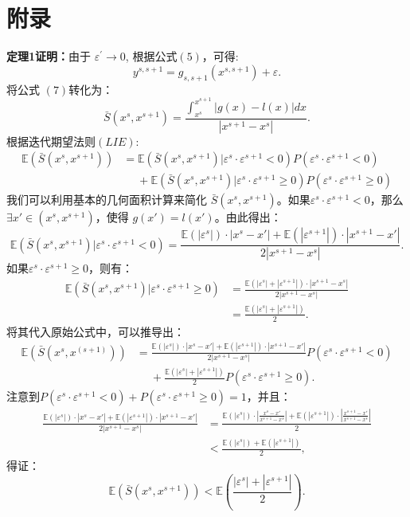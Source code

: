\documentclass[12pt,a4paper]{article}%
\begin{document}
	\section*{附录}
	\noindent\textbf{定理1证明：}由于 $\varepsilon^\prime\rightarrow0$, 根据公式$(5)$，可得: 
	$$y^{s,s+1}=g_{s,s+1}(x^{s,s+1})+\varepsilon.$$
	将公式 $(7)$转化为：
	$$\bar{S}(x^s,x^{s+1})=\frac{\int_{x^s}^{x^{s+1}}|g(x)-l(x)|  dx}{|x^{s+1}-x^s|}.$$
	根据迭代期望法则$(LIE)$:
	$$\begin{aligned}
		\mathbb{E}(\bar{S}(x^s,x^{s+1}))&=\mathbb{E}(\bar{S}(x^s,x^{s+1})|\varepsilon^s\cdot\varepsilon^{s+1}<0)P(\varepsilon^s\cdot\varepsilon^{s+1}<0) \\
		&\quad\; +\mathbb{E}(\bar{S}(x^s,x^{s+1})|\varepsilon^s\cdot\varepsilon^{s+1}\ge0)P(\varepsilon^s\cdot\varepsilon^{s+1}\ge0)
		\end{aligned}$$
	我们可以利用基本的几何面积计算来简化 $\bar{S}(x^s,x^{s+1})$。如果$\varepsilon^s\cdot\varepsilon^{s+1}<0$，那么$\exists{x'}\in(x^s,x^{s+1})$，使得 $g(x')=l(x')$。由此得出：
	$$\mathbb{E}(\bar{S}(x^s,x^{s+1})|\varepsilon^s\cdot\varepsilon^{s+1}<0)=\frac{\mathbb{E}(|\varepsilon^s|)\cdot|x^s-x'|+\mathbb{E}(|\varepsilon^{s+1}|)\cdot|x^{s+1}-x'|}{2|x^{s+1}-x^s|}.$$
	如果$\varepsilon^s\cdot\varepsilon^{s+1}\ge0$，则有：
	$$\begin{aligned}
    \mathbb{E}(\bar{S}(x^s,x^{s+1})|\varepsilon^s\cdot\varepsilon^{s+1}\ge0)&=\frac{\mathbb{E}(|\varepsilon^s|+|\varepsilon^{s+1}|)\cdot|x^{s+1}-x^{s}|}{2|x^{s+1}-x^s|}\\&=\frac{\mathbb{E}(|\varepsilon^s|+|\varepsilon^{s+1}|)}{2}.
    \end{aligned}$$
	将其代入原始公式中，可以推导出：
	$$\begin{aligned}
		\mathbb{E}({\bar{S}(x^{s}, x^{(s+1)})})&=
		\frac{{\mathbb{E}(|\varepsilon^s|)\cdot|x^s-x'|+\mathbb{E}(|\varepsilon^{s+1}|)\cdot|x^{s+1}-x'|}}{2|x^{s+1}-x^s|}P(\varepsilon^s\cdot\varepsilon^{s+1}<0)\\
		&\;\quad+\frac{\mathbb{E}(|\varepsilon^s|+|\varepsilon^{s+1}|)}{2}P(\varepsilon^s\cdot\varepsilon^{s+1}\ge0).
		\end{aligned}$$
	注意到$P(\varepsilon^s\cdot\varepsilon^{s+1}<0)+P(\varepsilon^s\cdot\varepsilon^{s+1}\ge0)=1$，并且：
	$$\begin{aligned}
		\frac{{\mathbb{E}(|\varepsilon^s|)\cdot|x^s-x'|+\mathbb{E}(|\varepsilon^{s+1}|)\cdot|x^{s+1}-x'|}}{2|x^{s+1}-x^s|}&=
    	\frac{{\mathbb{E}(|\varepsilon^s|)\cdot|\frac{x^s-x'}{x^{s+1}-x^s}|+\mathbb{E}(|\varepsilon^{s+1}|)\cdot|\frac{x^{s+1}-x'}{x^{s+1}-x^s}|}}{2}\\
    	&<\frac{{\mathbb{E}(|\varepsilon^s|)+\mathbb{E}(|\varepsilon^{s+1}|)}}{2},
		\end{aligned}$$
		得证：
		 $$\mathbb{E} (\bar{S}(x^s,x^{s+1}))< \mathbb{E}(\frac{|\varepsilon^s|+|\varepsilon^{s+1}|}{2}).$$
\end{document}

